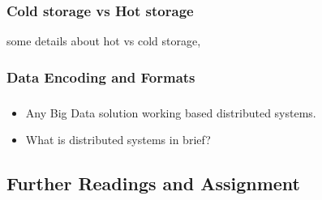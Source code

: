 \begin{frame}

\frametitle{Cold storage vs Hot storage}

some details about hot vs cold storage,

\end{frame}

\subsubsection{Data Encoding and Formats}
\begin{frame}
\frametitle{\subsecname}
\begin{itemize}[<+->]
\item Any Big Data solution working based distributed systems.
\item What is distributed systems in brief?
\end{itemize}
\end{frame}

\subsection{Further Readings and Assignment}



